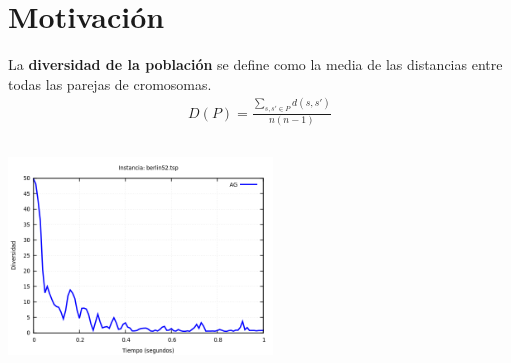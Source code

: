 
\section{Motivación}

{

	\setlength{\belowdisplayskip}{1pt} \setlength{\belowdisplayshortskip}{0pt}
	\setlength{\abovedisplayskip}{1pt} \setlength{\abovedisplayshortskip}{0pt}	
	
	\begin{frame}{}

		\fontsize{9}{10}\selectfont

		\begin{definition}
			La \textbf{diversidad de la población} se define como la media de las distancias entre todas las parejas de cromosomas.
			\begin{gather*}
				D(P) = \frac{\sum_{s,s' \in P} d(s,s')}{n(n-1)}
			\end{gather*}
		\end{definition}

		\begin{columns}[c]
			

				\centering \includegraphics[width=7cm]{./Images/Diversity/AG/png/berlin52.png}



\end{columns}
\end{frame}}
